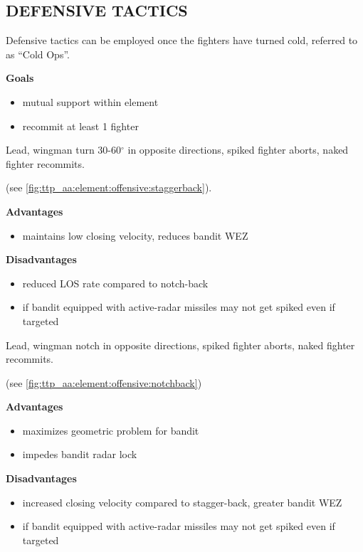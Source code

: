 \subsection{DEFENSIVE TACTICS}

\begin{tcoloritemize}
    Defensive tactics can be employed once the fighters have turned cold, 
    referred to as ``Cold Ops''.

    \medskip
    \textbf{Goals}
    \begin{itemize}
        \item mutual support within element
        \item recommit at least 1 fighter
    \end{itemize}

    Lead, wingman turn 30-60$^\circ$ in opposite directions, 
    spiked fighter aborts, naked fighter recommits.

    \hfill(see \cref{fig:ttp_aa:element:offensive:staggerback}).

    \bigskip
    \textbf{Advantages}
    \begin{itemize}
        \item maintains low closing velocity, 
        reduces bandit WEZ
    \end{itemize}

    \textbf{Disadvantages}
    \begin{itemize}
        \item reduced LOS rate compared to notch-back
        \item if bandit equipped with active-radar missiles may not get spiked even if targeted
    \end{itemize}

    Lead, wingman notch in opposite directions, 
    spiked fighter aborts, naked fighter recommits.
    
    \hfill(see \cref{fig:ttp_aa:element:offensive:notchback})

    \bigskip
    \textbf{Advantages}
    \begin{itemize}
        \item maximizes geometric problem for bandit
        \item impedes bandit radar lock
    \end{itemize}

    \textbf{Disadvantages}
    \begin{itemize}
        \item increased closing velocity compared to stagger-back, 
        greater bandit WEZ
        \item if bandit equipped with active-radar missiles may not get spiked even if targeted
    \end{itemize}

\end{tcoloritemize}

